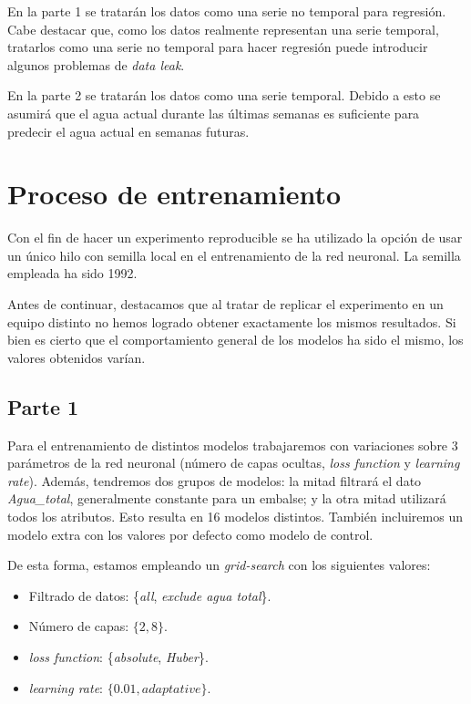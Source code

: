 \documentclass[12pt]{report} %
\begin{document}
    En la parte 1 se tratarán los datos como una serie no temporal para regresión.
    Cabe destacar que, como los datos realmente representan una serie temporal,
    tratarlos como una serie no temporal para hacer regresión puede introducir
    algunos problemas de \textit{data leak}.

    En la parte 2 se tratarán los datos como una serie temporal. Debido a esto
    se asumirá que el agua actual durante las últimas semanas es suficiente para
    predecir el agua actual en semanas futuras. 

\chapter{Proceso de entrenamiento}
\label{chap:train}
    Con el fin de hacer un experimento reproducible se ha utilizado la opción de usar un único hilo con semilla local en el entrenamiento de la red neuronal. La semilla empleada ha sido 1992.

    Antes de continuar, destacamos que al tratar de replicar el experimento en un equipo distinto no hemos logrado obtener exactamente los mismos resultados. Si bien es cierto que el comportamiento general de los modelos ha sido el mismo, los valores obtenidos varían.
	\section{Parte 1}

        Para el entrenamiento de distintos modelos trabajaremos con variaciones sobre 3 parámetros de la red neuronal (número de capas ocultas, \textit{loss function} y \textit{learning rate}). Además, tendremos dos grupos de modelos: la mitad filtrará el dato \textit{Agua\_total}, generalmente constante para un embalse; y la otra mitad utilizará todos los atributos. Esto resulta en 16 modelos distintos. También incluiremos un modelo extra con los valores por defecto como modelo de control.

        De esta forma, estamos empleando un \textit{grid-search} con los siguientes valores:
        \begin{itemize}
            \item Filtrado de datos: \{\textit{all}, \textit{exclude agua total}\}.
            \item Número de capas: $\{2, 8\}$.
            \item \textit{loss function}: \{\textit{absolute}, \textit{Huber}\}.
            \item \textit{learning rate}: $\{0.01, \textit{adaptative}\}$.
        \end{itemize}
\end{document}
